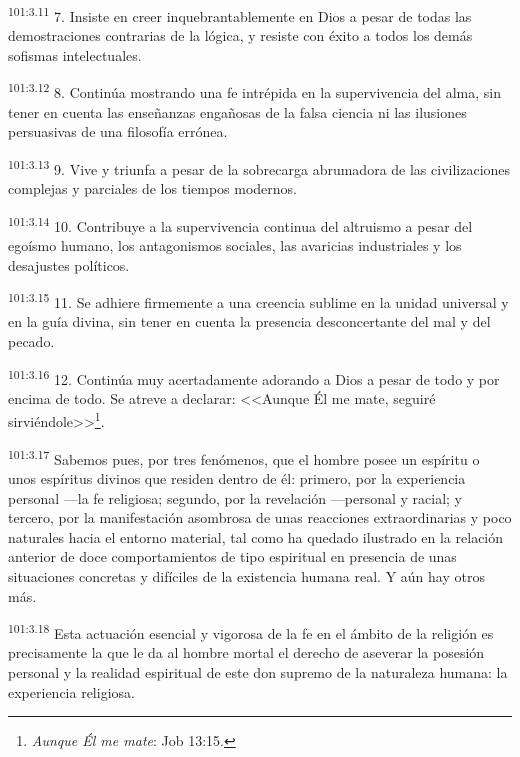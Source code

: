 \documentclass[twoside, 11pt]{book}
\begin{document}
\par
\textsuperscript{101:3.11} 7. Insiste en creer inquebrantablemente en Dios a pesar de todas las demostraciones contrarias de la lógica, y resiste con éxito a todos los demás sofismas intelectuales.

\par
\textsuperscript{101:3.12} 8. Continúa mostrando una fe intrépida en la supervivencia del alma, sin tener en cuenta las enseñanzas engañosas de la falsa ciencia ni las ilusiones persuasivas de una filosofía errónea.

\par
\textsuperscript{101:3.13} 9. Vive y triunfa a pesar de la sobrecarga abrumadora de las civilizaciones complejas y parciales de los tiempos modernos.

\par
\textsuperscript{101:3.14} 10. Contribuye a la supervivencia continua del altruismo a pesar del egoísmo humano, los antagonismos sociales, las avaricias industriales y los desajustes políticos.

\par
\textsuperscript{101:3.15} 11. Se adhiere firmemente a una creencia sublime en la unidad universal y en la guía divina, sin tener en cuenta la presencia desconcertante del mal y del pecado.

\par
\textsuperscript{101:3.16} 12. Continúa muy acertadamente adorando a Dios a pesar de todo y por encima de todo. Se atreve a declarar: <<Aunque Él me mate, seguiré sirviéndole>>\footnote{\textit{Aunque Él me mate}: Job 13:15.}.

\par
\textsuperscript{101:3.17} Sabemos pues, por tres fenómenos, que el hombre posee un espíritu o unos espíritus divinos que residen dentro de él: primero, por la experiencia personal ---la fe religiosa; segundo, por la revelación ---personal y racial; y tercero, por la manifestación asombrosa de unas reacciones extraordinarias y poco naturales hacia el entorno material, tal como ha quedado ilustrado en la relación anterior de doce comportamientos de tipo espiritual en presencia de unas situaciones concretas y difíciles de la existencia humana real. Y aún hay otros más.

\par
\textsuperscript{101:3.18} Esta actuación esencial y vigorosa de la fe en el ámbito de la religión es precisamente la que le da al hombre mortal el derecho de aseverar la posesión personal y la realidad espiritual de este don supremo de la naturaleza humana: la experiencia religiosa.
\end{document}
